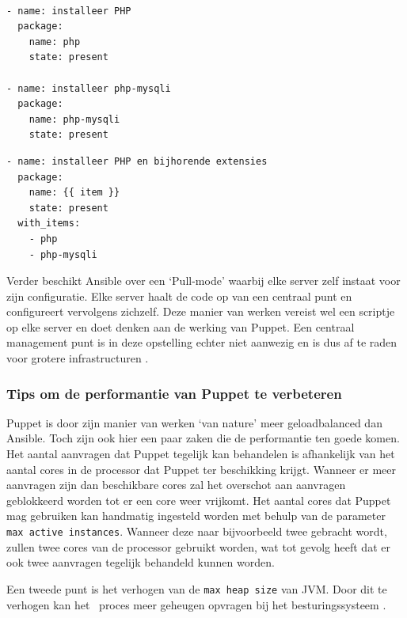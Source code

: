 \begin{lstlisting}[frame=single]

- name: installeer PHP
  package:
    name: php
    state: present

- name: installeer php-mysqli
  package:
    name: php-mysqli
    state: present
\end{lstlisting}

\begin{lstlisting}[frame=single]
- name: installeer PHP en bijhorende extensies
  package:
    name: {{ item }}
    state: present
  with_items:
    - php
    - php-mysqli
\end{lstlisting}

  Verder beschikt Ansible over een ‘Pull-mode' waarbij elke server zelf instaat voor zijn configuratie. Elke server haalt de code op van een centraal punt en configureert vervolgens zichzelf. Deze manier van werken vereist wel een scriptje op elke server en doet denken aan de werking van Puppet. Een centraal management punt is in deze opstelling echter niet aanwezig en is dus af te raden voor grotere infrastructuren \autocite{AnsibleTuning} .
  
 \subsubsection{Tips om de performantie van Puppet te verbeteren}
 Puppet is door zijn manier van werken ‘van nature' meer geloadbalanced dan Ansible. Toch zijn ook hier een paar zaken die de performantie ten goede komen. Het aantal aanvragen dat Puppet tegelijk kan behandelen is afhankelijk van het aantal cores in de processor dat Puppet ter beschikking krijgt. Wanneer er meer aanvragen zijn dan beschikbare cores zal het overschot aan aanvragen geblokkeerd worden tot er een core weer vrijkomt. Het aantal cores dat Puppet mag gebruiken kan handmatig ingesteld worden met behulp van de parameter \texttt{max active instances}. Wanneer deze naar bijvoorbeeld twee gebracht wordt, zullen twee cores van de processor gebruikt worden, wat tot gevolg heeft dat er ook twee aanvragen tegelijk behandeld kunnen worden. 
 
 Een tweede punt is het verhogen van de \texttt{max heap size} van \gls{JVM}. Door dit te verhogen kan het \ proces meer geheugen opvragen bij het besturingssysteem \autocite{PuppetTuning}.
 
